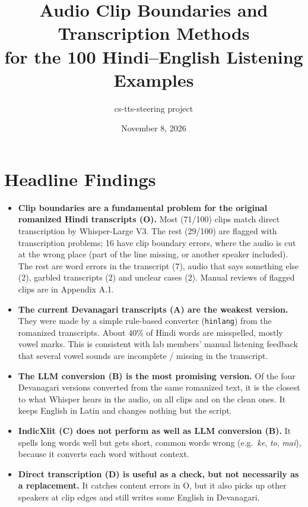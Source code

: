 \documentclass[11pt]{article}
\title{Audio Clip Boundaries and Transcription Methods\\for the 100 Hindi--English Listening Examples}
\author{cs-tts-steering project}
\date{November 8, 2026}
\begin{document}
\maketitle

\section*{Headline Findings}
\begin{itemize}
\item \textbf{Clip boundaries are a fundamental problem for the original romanized Hindi transcripts (O).} Most (71/100) clips match direct transcription by Whisper-Large V3. The rest (29/100) are flagged with transcription problems; 16 have clip boundary errors, where the audio is cut at the wrong place (part of the line missing, or another speaker included). The rest are word errors in the transcript (7), audio that says something else (2), garbled transcripts (2) and unclear cases (2). Manual reviews of flagged clips are in Appendix A.1.
\item \textbf{The current Devanagari transcripts (A) are the weakest version.} They were made by a simple rule-based converter (\texttt{hinlang}) from the romanized transcripts. About 40\% of Hindi words are misspelled, mostly vowel marks. This is consistent with lab members' manual listening feedback that several vowel sounds are incomplete / missing in the transcript.
\item \textbf{The LLM conversion (B) is the most promising version.} Of the four Devanagari versions converted from the same romanized text, it is the closest to what Whisper hears in the audio, on all clips and on the clean ones. It keeps English in Latin and changes nothing but the script.
\item \textbf{IndicXlit (C) does not perform as well as LLM conversion (B).} It spells long words well but gets short, common words wrong (e.g.\ \emph{ke}, \emph{to}, \emph{mai}), because it converts each word without context.
\item \textbf{Direct transcription (D) is useful as a check, but not necessarily as a replacement.} It catches content errors in O, but it also picks up other speakers at clip edges and still writes some English in Devanagari.
\end{itemize}
\end{document}
